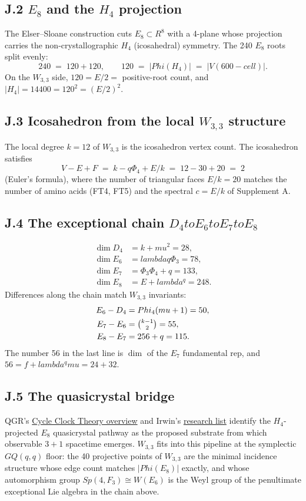 \documentclass[12pt,a4paper]{article}
\def\mathbb#1{#1}%
\def\mathrm#1{#1}%
\def\text#1{#1}%
\def\lambda{lambda}%
\def\mu{mu}%
\def\Phi#1{Phi#1}%
\def\cdot{ }%
\def\to{ to }%
\theoremstyle{definition}
\newcommand{\GQ}{\mathrm{GQ}}
\newcommand{\Sp}{\mathrm{Sp}}
\newcommand{\FF}{\mathbb{F}}
\newcommand{\RR}{\mathbb{R}}
\begin{document}
\subsection*{J.2 \quad $E_8$ and the $H_4$ projection}
The Elser--Sloane construction cuts $E_8 \subset \RR^8$ with a 4-plane
whose projection carries the non-crystallographic $H_4$ (icosahedral)
symmetry. The 240 $E_8$ roots split evenly:
\[
240 \;=\; 120 + 120,\qquad
120 \;=\; |\Phi(H_4)| \;=\; |V(\text{600-cell})|.
\]
On the $W_{3,3}$ side, $120 = E/2 = $ positive-root count, and
$|H_4| = 14400 = 120^2 = (E/2)^2$.

\subsection*{J.3 \quad Icosahedron from the local $W_{3,3}$ structure}
The local degree $k=12$ of $W_{3,3}$ is the icosahedron vertex count.
The icosahedron satisfies
\[
V-E+F \;=\; k - q\Phi_4 + E/k \;=\; 12 - 30 + 20 \;=\; 2
\]
(Euler's formula), where the number of triangular faces $E/k = 20$ matches
the number of amino acids (FT4, FT5) and the spectral $c = E/k$ of
Supplement A.

\subsection*{J.4 \quad The exceptional chain $D_4 \to E_6 \to E_7 \to E_8$}
\[
\begin{aligned}
\dim D_4 &= k+\mu^2 = 28,\\
\dim E_6 &= \lambda q\Phi_3 = 78,\\
\dim E_7 &= \Phi_3\Phi_4+q = 133,\\
\dim E_8 &= E+\lambda^q = 248.
\end{aligned}
\]
Differences along the chain match $W_{3,3}$ invariants:
\[
\begin{aligned}
E_6-D_4 &= \Phi_4(\mu+1) = 50,\\
E_7-E_6 &= \tbinom{k-1}{2} = 55,\\
E_8-E_7 &= 2\cdot 56 + q = 115.
\end{aligned}
\]
The number 56 in the last line is $\dim$ of the $E_7$ fundamental rep,
and $56 = f + \lambda^q\mu = 24+32$.

\subsection*{J.5 \quad The quasicrystal bridge}
QGR's
\href{https://quantumgravityresearch.org/cycle-clock-theory-overview/}{Cycle Clock Theory overview}
and Irwin's
\href{https://kleeirwin.com/research/}{research list}
identify the $H_4$-projected $E_8$ quasicrystal pathway as the
proposed substrate from which observable $3{+}1$ spacetime emerges.
$W_{3,3}$ fits into this pipeline at the symplectic $\GQ(q,q)$ floor:
the 40 projective points of $W_{3,3}$ are the minimal incidence
structure whose edge count matches $|\Phi(E_8)|$ exactly, and whose
automorphism group $\Sp(4,\FF_3) \cong W(E_6)$ is the Weyl group of the
penultimate exceptional Lie algebra in the chain above.
\end{document}
